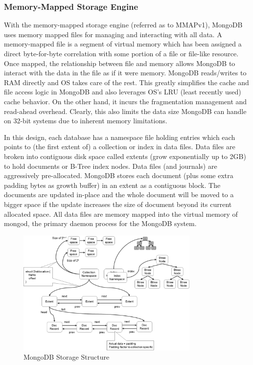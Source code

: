 \documentclass[12pt]{book}
\begin{document}
\subsubsection{Memory-Mapped Storage Engine}
With the memory-mapped storage engine (referred as to MMAPv1), MongoDB uses memory mapped files for managing and interacting with all data. A memory-mapped file is a segment of virtual memory which has been assigned a direct byte-for-byte correlation with some portion of a file or file-like resource. Once mapped, the relationship between file and memory allows MongoDB to interact with the data in the file as if it were memory.
MongoDB reads/writes to RAM directly and OS takes care of the rest. This greatly simplifies the cache and file access logic in MongoDB and also leverages OS's LRU (least recently used) cache behavior. On the other hand, it incurs the fragmentation management and read-ahead overhead. Clearly, this also limits the data size MongoDB can handle on 32-bit systems due to inherent memory limitations.

In this design, each database has a namespace file holding entries which each points to (the first extent of) a collection or index in data files. Data files are broken into contiguous disk space called extents (grow exponentially up to 2GB) to hold documents or B-Tree index nodes. Data files (and journals) are aggressively pre-allocated. MongoDB stores each document (plus some extra padding bytes as growth buffer) in an extent as a contiguous block. The documents are updated in-place and the whole document will be moved to a bigger space if the update increases the size of document beyond its current allocated space. All data files are memory mapped into the virtual memory of mongod, the primary daemon process for the MongoDB system.

\begin{figure}[t]
\includegraphics[width=0.8\textwidth]{images/mongodb-storage-structure.png}
\centering
\caption{MongoDB Storage Structure}
\end{figure}
\end{document}
